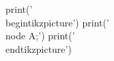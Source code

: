 \documentclass{scrartcl}
\begin{document}
  \begin{pycode}
print('\\begin{tikzpicture}')
print('\\node {A};')
print('\\end{tikzpicture}')
  \end{pycode}
\end{document}
